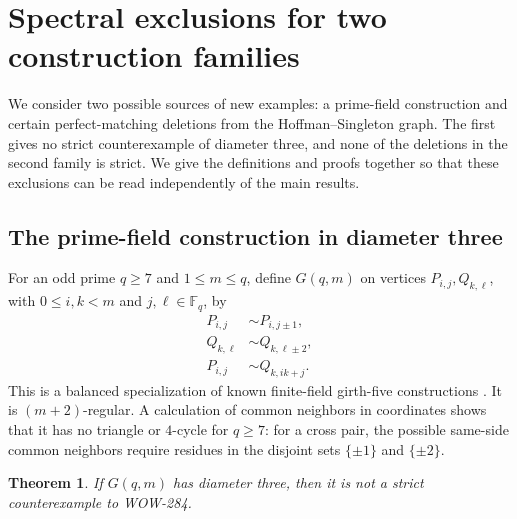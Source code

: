\documentclass[a4paper,10pt,reqno]{amsart}
\theoremstyle{plain}
\newtheorem{theorem}{Theorem}[section]
\theoremstyle{definition}
\theoremstyle{remark}
\begin{document}
\section{Spectral exclusions for two construction families}
\label{app:excluded-constructions}

We consider two possible sources of new examples: a prime-field
construction and certain perfect-matching deletions from the Hoffman--Singleton graph.
The first gives no strict counterexample of diameter three, and none of the
deletions in the second family is strict. We give the definitions and proofs
together so that these exclusions can be read independently of the main results.

\subsection{The prime-field construction in diameter three}

For an odd prime \(q\ge7\) and \(1\le m\le q\), define \(G(q,m)\) on
vertices \(P_{i,j},Q_{k,\ell}\), with \(0\le i,k<m\) and
\(j,\ell\in\mathbb F_q\), by
\begin{align*}
P_{i,j}&\sim P_{i,j\pm1},\\
Q_{k,\ell}&\sim Q_{k,\ell\pm2},\\
P_{i,j}&\sim Q_{k,ik+j}.
\end{align*}
This is a balanced specialization of known finite-field girth-five
constructions \cite{AbreuEtAl2008}.  It is \((m+2)\)-regular.  A calculation
of common neighbors in coordinates shows that it has no triangle or \(4\)-cycle for
\(q\ge7\): for a cross pair, the possible same-side common neighbors require
residues in the disjoint sets \(\{\pm1\}\) and \(\{\pm2\}\).

\begin{theorem}\label{thm:prime-field}
If \(G(q,m)\) has diameter three, then it is not a strict counterexample to
WOW-284.
\end{theorem}
\end{document}
